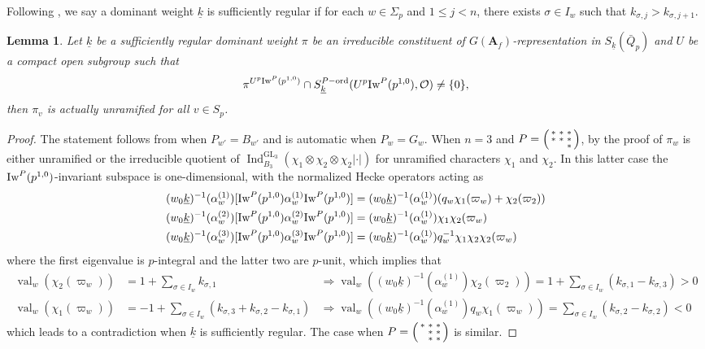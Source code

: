 \documentclass[leqno]{amsart}
\newcommand{\wt}[1]{\underline{ #1 }}
\newcommand{\Iw}{\textnormal{Iw}}
\newcommand{\ord}{\textnormal{ord}}
\DeclareMathOperator{\GL}{GL}
\newcommand{\A}{\mathbf A}
\newcommand{\oo}{\mathcal{O}} %
\DeclareMathOperator{\val}{val}
\DeclareMathOperator{\Ind}{Ind}
\newtheorem{lem}[thm]{Lemma}
\theoremstyle{definition}
\theoremstyle{remark}
\begin{document}
Following \cite{ger},
we say a dominant weight $\wt{k}$ is sufficiently regular
if for each $w\in \Sigma_p$ and $1\leq j<n$,
there exists  $\sigma\in I_w$
such that  $k_{\sigma,j}>k_{\sigma,j+1}$.
\begin{lem}
	Let $\wt{k}$ be a sufficiently regular dominant weight
	$\pi$ be an irreducible constituent of 
	$G(\A_f)$-representation in $S_{\wt{k}}(\bar{Q}_p)$
	and $U$ be a compact open subgroup such that 
	\[
		\pi^{U^p\Iw^P(p^{1,0})}\cap 
		S^{P-\ord}_{\wt{k}}(U^p\Iw^P(p^{1,0}),\oo)\neq\{0\},
	\]
	then $\pi_v$ is actually unramified for all $v\in S_p$.
\end{lem}
\begin{proof}
	The statement follows from \cite[Lem 2.30]{ger} when $P_{w'}=B_{w'}$
	and is automatic when $P_w=G_w$.
	When $n=3$ and
	$P=\begin{psmallmatrix}
		*&*&*\\
		*&*&*\\
		 &&*
	\end{psmallmatrix}$,
	by the proof of \cite[Lem 3.1.5]{CHT}
	$\pi_w$ is either unramified or 
	the irreducible quotient of 
	$\Ind_{B_3}^{\GL_3}(\chi_1\otimes \chi_2\otimes\chi_2|\cdot|)$
	for unramified characters  $\chi_1$ and $\chi_2$.
	In this latter case
	the  $\Iw^P(p^{1,0})$-invariant subspace is one-dimensional, with
	the normalized Hecke operators acting as
	\begin{align*}
		(w_0\wt{k})^{-1}(\alpha_w^{(1)})
		[\Iw^P(p^{1,0})\alpha_w^{(1)}\Iw^P(p^{1,0})]&=
		(w_0\wt{k})^{-1}(\alpha_w^{(1)})
		(q_w\chi_1(\varpi_w)+\chi_2(\varpi_2))\\
		(w_0\wt{k})^{-1}(\alpha_w^{(2)})
		[\Iw^P(p^{1,0})\alpha_w^{(2)}\Iw^P(p^{1,0})]&=
		(w_0\wt{k})^{-1}(\alpha_w^{(1)})
		\chi_1\chi_2(\varpi_w)\\
		(w_0\wt{k})^{-1}(\alpha_w^{(3)})
		[\Iw^P(p^{1,0})\alpha_w^{(3)}\Iw^P(p^{1,0})]&=
		(w_0\wt{k})^{-1}(\alpha_w^{(1)})
		q_w^{-1}\chi_1\chi_2\chi_2(\varpi_w)
	\end{align*}
	where the first eigenvalue is $p$-integral
	and the latter two are $p$-unit, which implies that
	\begin{align*}
		\val_w(\chi_2(\varpi_w))&=
		1+\sum_{\sigma\in I_w}k_{\sigma,1}
		&\Longrightarrow
		\val_w((w_0\wt{k})^{-1}(\alpha_w^{(1)})\chi_2(\varpi_2))=
		1+\sum_{\sigma\in I_w}(k_{\sigma,1}-k_{\sigma,3})>0\\
		\val_w(\chi_1(\varpi_w))&=
		-1+\sum_{\sigma\in I_w}
		(k_{\sigma,3}+k_{\sigma,2}-k_{\sigma,1})
		&\Longrightarrow
		\val_w((w_0\wt{k})^{-1}(\alpha_w^{(1)})q_w\chi_1(\varpi_w))=
		\sum_{\sigma\in I_w}(k_{\sigma,2}-k_{\sigma,2})<0
	\end{align*}
	which leads to a contradiction when $\wt{k}$
	is sufficiently regular.
	The case when
	$P=\begin{psmallmatrix}
	*&*&*\\
	&*&*\\
	&*&*
	\end{psmallmatrix}$ is similar.
\end{proof}
\end{document}
